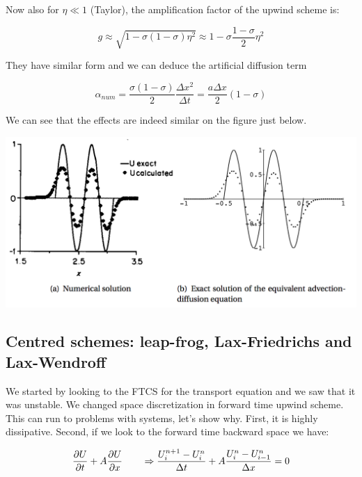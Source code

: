 Now also for $\eta \ll 1$ (Taylor), the amplification factor of the upwind scheme is: 

\begin{equation}
g \approx \sqrt{1 - \sigma (1-\sigma )\eta ^2} \approx 1 - \sigma \frac{1-\sigma}{2}\eta ^2
\end{equation}

They have similar form and we can deduce the artificial diffusion term 

\begin{equation}
\alpha _{num} = \frac{\sigma (1-\sigma)}{2}\frac{\Delta x^2}{\Delta t} = \frac{a \Delta x}{2}(1- \sigma)
\end{equation}

We can see that the effects are indeed similar on the figure just below. 

\begin{center}
\includegraphics[scale=0.5]{ch3/10}
\end{center}

\subsection{Centred schemes: leap-frog, Lax-Friedrichs and Lax-Wendroff}

We started by looking to the FTCS for the transport equation and we saw that it was unstable. We changed space discretization in forward time upwind scheme. This can run to problems with systems, let's show why. First, it is highly dissipative. Second, if we look to the forward time backward space we have: 

\begin{equation}
\frac{\partial U}{\partial t} + A\frac{\partial U}{\partial x} \qquad \Rightarrow \frac{U^{n+1}_{i} - U^{n}_{i}}{\Delta t} + A \frac{U^{n}_{i} - U^{n}_{i-1}}{\Delta x} = 0
\end{equation}

